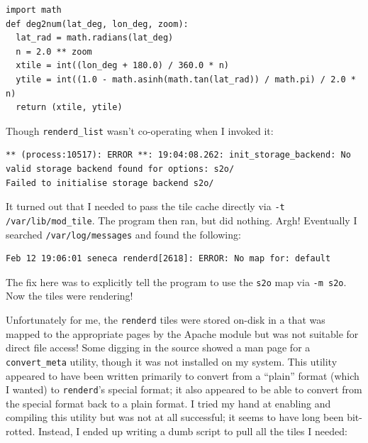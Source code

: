 \documentclass{article}
\begin{document}
\begin{verbatim}
import math
def deg2num(lat_deg, lon_deg, zoom):
  lat_rad = math.radians(lat_deg)
  n = 2.0 ** zoom
  xtile = int((lon_deg + 180.0) / 360.0 * n)
  ytile = int((1.0 - math.asinh(math.tan(lat_rad)) / math.pi) / 2.0 * n)
  return (xtile, ytile)
\end{verbatim}

Though \texttt{renderd_list} wasn't co-operating when I invoked it:

\begin{verbatim}
** (process:10517): ERROR **: 19:04:08.262: init_storage_backend: No valid storage backend found for options: s2o/
Failed to initialise storage backend s2o/
\end{verbatim}

It turned out that I needed to pass the tile cache directly via \texttt{-t /var/lib/mod_tile}.  The program then ran, but did nothing.  Argh!  Eventually I searched \texttt{/var/log/messages} and found the following:

\begin{verbatim}
Feb 12 19:06:01 seneca renderd[2618]: ERROR: No map for: default
\end{verbatim}

The fix here was to explicitly tell the program to use the \texttt{s2o} map via \texttt{-m s2o}.  Now the tiles were rendering!

Unfortunately for me, the \texttt{renderd} tiles were stored on-disk in a  that was mapped to the appropriate pages by the Apache module but was not suitable for direct file access!  Some digging in the source showed a man page for a \texttt{convert_meta} utility, though it was not installed on my system.  This utility appeared to have been written primarily to convert from a ``plain'' format (which I wanted) to \texttt{renderd}'s special format; it also appeared to be able to convert from the special format back to a plain format.  I tried my hand at enabling and compiling this utility but was not at all successful; it seems to have long been bit-rotted.  Instead, I ended up writing a dumb script to pull all the tiles I needed:
\end{document}
